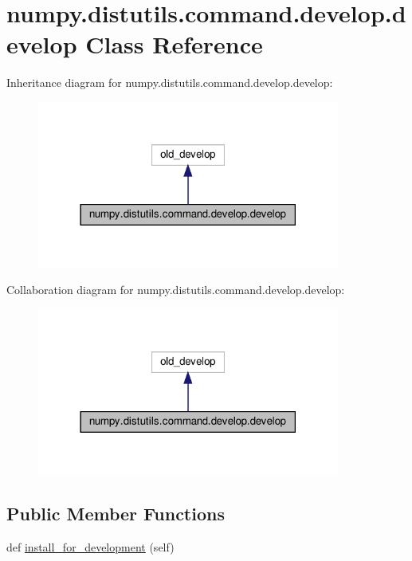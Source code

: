 \hypertarget{classnumpy_1_1distutils_1_1command_1_1develop_1_1develop}{}\section{numpy.\+distutils.\+command.\+develop.\+develop Class Reference}
\label{classnumpy_1_1distutils_1_1command_1_1develop_1_1develop}


Inheritance diagram for numpy.\+distutils.\+command.\+develop.\+develop\+:
\nopagebreak
\begin{figure}[H]
\begin{center}
\leavevmode
\includegraphics[width=282pt]{classnumpy_1_1distutils_1_1command_1_1develop_1_1develop__inherit__graph}
\end{center}
\end{figure}


Collaboration diagram for numpy.\+distutils.\+command.\+develop.\+develop\+:
\nopagebreak
\begin{figure}[H]
\begin{center}
\leavevmode
\includegraphics[width=282pt]{classnumpy_1_1distutils_1_1command_1_1develop_1_1develop__coll__graph}
\end{center}
\end{figure}
\subsection*{Public Member Functions}
\begin{DoxyCompactItemize}
\item 
def \hyperlink{classnumpy_1_1distutils_1_1command_1_1develop_1_1develop_a2b2d904d0a8438debb5ed6ac6be87f1f}{install\+\_\+for\+\_\+development} (self)
\end{DoxyCompactItemize}


